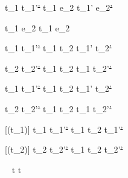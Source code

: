   {t_1\st{}  t_1'\st{'}}
  {t_1 \Next e_2\st{}  t_1' \Next e_2\st{'}}

  { }
  {t_1 \Next e_2\st{} \handle{\Continue} t_1 \Then e_2\st{}}


  {t_1\st{}  t_1'\st{'} }
  {t_1 \And t_2\st{}  t_1' \And t_2\st{'}}

  {t_2\st{}  t_2'\st{'} }
  {t_1\st{} \And t_2  t_1 \And t_2'\st{'}}


  {t_1\st{}  t_1'\st{'} }
  {t_1 \Or t_2\st{}  t_1' \Or t_2\st{'}}

  {t_2\st{}  t_2'\st{'} }
  {t_1\st{} \Or t_2  t_1 \Or t_2'\st{'}}


[\Succeeding(t_1)]
  {t_1\st{}  t_1'\st{'}}
  {t_1 \Xor t_2\st{}  t_1'\st{'}}

[\Succeeding(t_2)]
  {t_2\st{}  t_2'\st{'}}
  {t_1 \Xor t_2\st{}  t_2'\st{'}}

  {\ }
  {t\st{} \handle{\Pick \Here} t\st{}}











